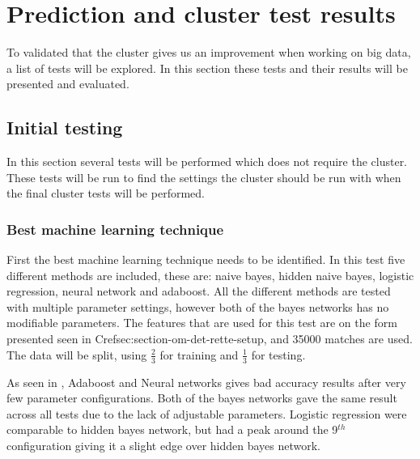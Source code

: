\section{Prediction and cluster test results}\label{sec:testing}
To validated that the cluster gives us an improvement when working on big data, a list of tests will be explored. In this section these tests and their results will be presented and evaluated.

\subsection{Initial testing}
In this section several tests will be performed which does not require the cluster. These tests will be run to find the settings the cluster should be run with when the final cluster tests will be performed.

\subsubsection{Best machine learning technique}
First the best machine learning technique needs to be identified. In this test five different methods are included, these are: naive bayes, hidden naive bayes, logistic regression, neural network and adaboost. All the different methods are tested with multiple parameter settings, however both of the bayes networks has no modifiable parameters. The features that are used for this test are on the form presented seen in Cref{sec:section-om-det-rette-setup}, and 35000 matches are used. The data will be split, using $\frac{2}{3}$ for training and $\frac{1}{3}$ for testing. 

As seen in , Adaboost and Neural networks gives bad accuracy results after very few parameter configurations. Both of the bayes networks gave the same result across all tests due to the lack of adjustable parameters. Logistic regression were comparable to hidden bayes network, but had a peak around the 9$^{th}$ configuration giving it a slight edge over hidden bayes network.

